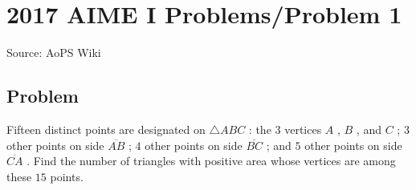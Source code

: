 \documentclass[12pt]{article}
\begin{document}
\section*{{2017 AIME I Problems/Problem 1}}
Source: AoPS Wiki

\subsection*{Problem}
Fifteen distinct points are designated on $\triangle ABC$ : the 3 vertices $A$ , $B$ , and $C$ ; $3$ other points on side $\overline{AB}$ ; $4$ other points on side $\overline{BC}$ ; and $5$ other points on side $\overline{CA}$ . Find the number of triangles with positive area whose vertices are among these $15$ points.
\end{document}
